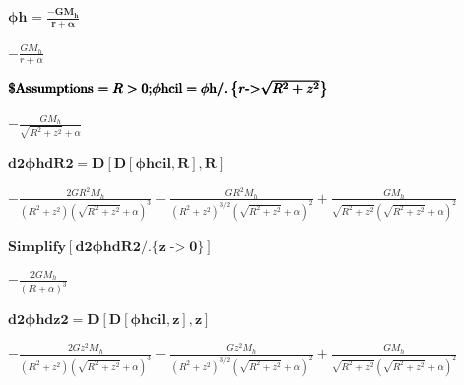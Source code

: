 \documentclass{article}
\begin{document}
\begin{doublespace}
\noindent\(\pmb{\text{$\phi $h} = \frac{-G M_h }{r+\alpha }}\)
\end{doublespace}

\begin{doublespace}
\noindent\(-\frac{G M_h}{r+\alpha }\)
\end{doublespace}

\begin{doublespace}
\noindent\(\pmb{\text{$\$$Assumptions}=R>0;}\\
\pmb{\text{$\phi $hcil}=\text{$\phi $h}\text{/.}\left\{r\text{-$>$}\sqrt{R^2+z^2}\right\}}\)
\end{doublespace}

\begin{doublespace}
\noindent\(-\frac{G M_h}{\sqrt{R^2+z^2}+\alpha }\)
\end{doublespace}

\begin{doublespace}
\noindent\(\pmb{\text{d2$\phi $hdR2}=D[D[\text{$\phi $hcil},R],R]}\)
\end{doublespace}

\begin{doublespace}
\noindent\(-\frac{2 G R^2 M_h}{\left(R^2+z^2\right) \left(\sqrt{R^2+z^2}+\alpha \right)^3}-\frac{G R^2 M_h}{\left(R^2+z^2\right)^{3/2} \left(\sqrt{R^2+z^2}+\alpha
\right)^2}+\frac{G M_h}{\sqrt{R^2+z^2} \left(\sqrt{R^2+z^2}+\alpha \right)^2}\)
\end{doublespace}

\begin{doublespace}
\noindent\(\pmb{\text{Simplify}[\text{d2$\phi $hdR2}\text{/.}\{z\text{-$>$}0\}]}\)
\end{doublespace}

\begin{doublespace}
\noindent\(-\frac{2 G M_h}{(R+\alpha )^3}\)
\end{doublespace}

\begin{doublespace}
\noindent\(\pmb{\text{d2$\phi $hdz2}=D[D[\text{$\phi $hcil},z],z]}\)
\end{doublespace}

\begin{doublespace}
\noindent\(-\frac{2 G z^2 M_h}{\left(R^2+z^2\right) \left(\sqrt{R^2+z^2}+\alpha \right)^3}-\frac{G z^2 M_h}{\left(R^2+z^2\right)^{3/2} \left(\sqrt{R^2+z^2}+\alpha
\right)^2}+\frac{G M_h}{\sqrt{R^2+z^2} \left(\sqrt{R^2+z^2}+\alpha \right)^2}\)
\end{doublespace}
\end{document}
